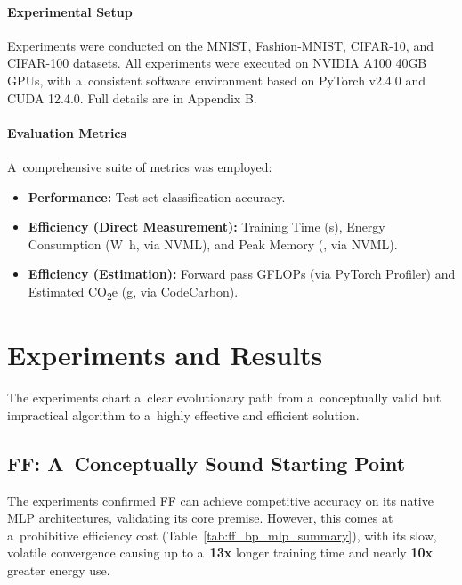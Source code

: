 \documentclass[letterpaper]{article}
\begin{document}
\paragraph{Experimental Setup}
Experiments were conducted on the MNIST, Fashion-MNIST, CIFAR-10, and CIFAR-100 datasets. All experiments were executed on NVIDIA A100 40GB GPUs, with a~consistent software environment based on PyTorch v2.4.0 and CUDA 12.4.0. Full details are in Appendix B.

\paragraph{Evaluation Metrics}
A~comprehensive suite of metrics was employed:
\begin{itemize}
    \item \textbf{Performance:} Test set classification accuracy.
    \item \textbf{Efficiency (Direct Measurement):} Training Time (\si{\second}), Energy Consumption (\si{\watt\hour}, via NVML), and Peak Memory (\si{\mebibyte}, via NVML).
    \item \textbf{Efficiency (Estimation):} Forward pass GFLOPs (via PyTorch Profiler) and Estimated CO\textsubscript{2}e (\si{\gram}, via CodeCarbon).
\end{itemize}

\section{Experiments and Results}

The experiments chart a~clear evolutionary path from a~conceptually valid but impractical algorithm to a~highly effective and efficient solution.

\subsection{FF: A~Conceptually Sound Starting Point}

The experiments confirmed FF can achieve competitive accuracy on its native MLP architectures, validating its core premise. However, this comes at a~prohibitive efficiency cost (Table~\ref{tab:ff_bp_mlp_summary}), with its slow, volatile convergence causing up to a~\textbf{13x} longer training time and nearly \textbf{10x} greater energy use.

\begin{table}[htbp]
    \centering
    \caption{Performance and Efficiency: FF vs. BP on a~4x2000 MLP for Fashion-MNIST (Mean of 3 runs). Better results are bolded.}
    \label{tab:ff_bp_mlp_summary}
\end{table}
\end{document}
